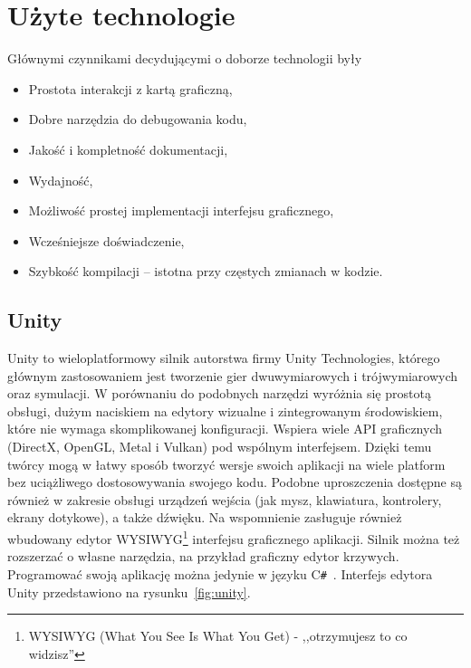 \chapter*{Użyte technologie}
Głównymi czynnikami decydującymi o doborze technologii były
\begin{itemize}
	\item Prostota interakcji z kartą graficzną,
	\item Dobre narzędzia do debugowania kodu,
	\item Jakość i kompletność dokumentacji,
	\item Wydajność,
	\item Możliwość prostej implementacji interfejsu graficznego,
	\item Wcześniejsze doświadczenie,
	\item Szybkość kompilacji -- istotna przy częstych zmianach w kodzie.
\end{itemize}
\section*{Unity}
Unity to wieloplatformowy silnik autorstwa firmy Unity Technologies, którego głównym zastosowaniem jest tworzenie gier dwuwymiarowych i trójwymiarowych oraz symulacji. W porównaniu do podobnych narzędzi wyróżnia się prostotą obsługi, dużym naciskiem na edytory wizualne i zintegrowanym środowiskiem, które nie wymaga skomplikowanej konfiguracji. Wspiera wiele API graficznych (DirectX, OpenGL, Metal i Vulkan)\cite{UnityManualGraphicsApiSupport} pod wspólnym interfejsem. Dzięki temu twórcy mogą w łatwy sposób tworzyć wersje swoich aplikacji na wiele platform bez uciążliwego dostosowywania swojego kodu. Podobne uproszczenia dostępne są również w zakresie obsługi urządzeń wejścia (jak mysz, klawiatura, kontrolery, ekrany dotykowe), a także dźwięku. Na wspomnienie zasługuje również wbudowany edytor WYSIWYG\footnote{WYSIWYG (What You See Is What You Get) - ,,otrzymujesz to co widzisz''} interfejsu graficznego aplikacji. Silnik można też rozszerzać o własne narzędzia, na przykład graficzny edytor krzywych. Programować swoją aplikację można jedynie w języku C\texttt{\#}~\cite{ProgramminginUnity}. Interfejs edytora Unity przedstawiono na rysunku~\ref{fig:unity}.
